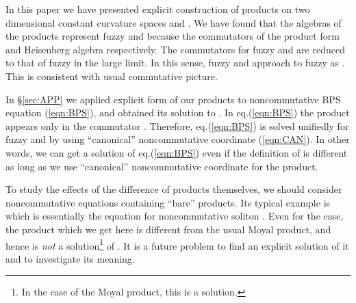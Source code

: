\documentclass[12pt,a4paper]{article}
\def\h{\hbar}
\begin{document}
In this paper we have presented explicit construction of \myHighlight{$*$}\coordHE{}
products on two dimensional constant curvature spaces \coordHE{} and \coordHE{}.
We have found that the algebras of the \myHighlight{$*$}\coordHE{} products represent fuzzy 
\coordHE{} and \coordHE{} because the commutators of the \myHighlight{$*$}\coordHE{} product form
\coordHE{} and Heisenberg algebra respectively.  
The commutators \myHighlight{$[z,{\bar z}]_*$}\coordHE{} for fuzzy 
\coordHE{} and \coordHE{} are reduced to that of fuzzy \coordHE{} in the large \coordHE{}
limit.
In this sense, fuzzy \coordHE{} and \coordHE{} approach to fuzzy \coordHE{} as \coordHE{}.
This is consistent with usual commutative picture.

In \S \ref{sec:APP} we applied explicit form of our \myHighlight{$*$}\coordHE{} products to \coordHE{}
noncommutative BPS equation (\ref{eqn:BPS}), and obtained its solution
to \myHighlight{${\cal O}(\h^2)$}\coordHE{}. 
In eq.(\ref{eqn:BPS}) the \myHighlight{$*$}\coordHE{} product appears only in the commutator \myHighlight{$[\ ,\
]_*$}\coordHE{}. Therefore, eq.(\ref{eqn:BPS}) is solved unifiedly for
fuzzy \myHighlight{$S^2,H^2$}\coordHE{} and \coordHE{} by using ``canonical'' noncommutative
coordinate \myHighlight{${\tilde \phi}^I$}\coordHE{} (\ref{eqn:CAN}). In other words, we can
get a solution of eq.(\ref{eqn:BPS}) even if the definition of \myHighlight{$*$}\coordHE{} is
different as long as we use ``canonical'' noncommutative coordinate
\myHighlight{${\tilde \phi}^I$}\coordHE{} for the \myHighlight{$*$}\coordHE{} product.

To study the effects of the difference of \myHighlight{$*$}\coordHE{} products themselves, we
should consider noncommutative equations containing ``bare'' \myHighlight{$*$}\coordHE{}
products.
Its typical example is \myHighlight{$\phi*\phi=\phi$}\coordHE{} which is essentially the equation
for noncommutative soliton \cite{GMS}. Even for the \myHighlight{${\mathbb R}^2$}\coordHE{} case,
the \myHighlight{$*$}\coordHE{} product which we get here is different from the usual Moyal product,
and hence \myHighlight{$\phi\sim\exp(- r^2)$}\coordHE{} is {\it not} a solution\footnote{
In the case of the Moyal product, this is a solution.
} of  \myHighlight{$\phi*\phi=\phi$}\coordHE{}.
It is a future problem to find an explicit solution of it and to
investigate its meaning.
\end{document}
